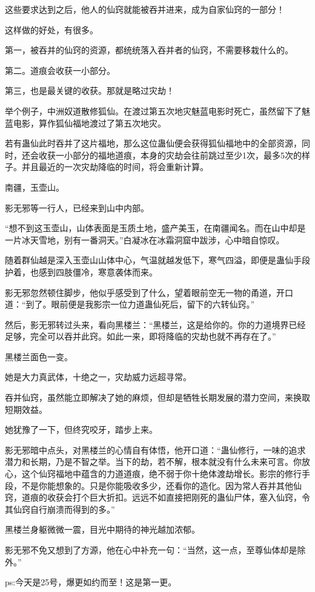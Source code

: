 \begin{this_body}
这些要求达到之后，他人的仙窍就能被吞并进来，成为自家仙窍的一部分！

这样做的好处，有很多。

第一，被吞并的仙窍的资源，都统统落入吞并者的仙窍，不需要移栽什么的。

第二。道痕会收获一小部分。

第三，也是最关键的收获。那就是略过灾劫！

举个例子，中洲奴道散修狐仙。在渡过第五次地灾魅蓝电影时死亡，虽然留下了魅蓝电影，算作狐仙福地渡过了第五次地灾。

若有蛊仙此时吞并了这片福地，那么这位蛊仙便会获得狐仙福地中的全部资源，同时，还会收获一小部分的福地道痕，本身的灾劫会往前跳过至少1次，最多5次的样子。并且最近的一次灾劫降临的时间，将会重新计算。

南疆，玉壶山。

影无邪等一行人，已经来到山中内部。

“想不到这玉壶山，山体表面是玉质土地，盛产美玉，在南疆闻名。而在山中却是一片冰天雪地，别有一番洞天。”白凝冰在冰霜洞窟中跋涉，心中暗自惊叹。

随着群仙越是深入玉壶山山体中心，气温就越发低下，寒气四溢，即便是蛊仙手段护着，也感到四肢僵冷，寒意袭体而来。

影无邪忽然顿住脚步，他似乎感受到了什么，望着眼前空无一物的甬道，开口道：“到了。眼前便是我影宗一位力道蛊仙死后，留下的六转仙窍。”

然后，影无邪转过头来，看向黑楼兰：“黑楼兰，这是给你的。你的力道境界已经足够，完全可以吞并此窍。如此一来，即将降临的灾劫也就不再存在了。”

黑楼兰面色一变。

她是大力真武体，十绝之一，灾劫威力远超寻常。

吞并仙窍，虽然能立即解决了她的麻烦，但却是牺牲长期发展的潜力空间，来换取短期效益。

她犹豫了一下，但终究咬牙，踏步上来。

影无邪暗中点头，对黑楼兰的心情自有体悟，他开口道：“蛊仙修行，一味的追求潜力和长期，乃是不智之举。当下的劫，若不解，根本就没有什么未来可言。你放心，这个仙窍福地中蕴含的力道道痕，绝不弱于你十绝体渡劫增长。影宗的修行手段，不是你能想象的。只是你能吸收多少，还看你的造化。因为常人吞并其他仙窍，道痕的收获会打个巨大折扣。远远不如直接把刚死的蛊仙尸体，塞入仙窍，令其仙窍自行崩溃而得到的多。”

黑楼兰身躯微微一震，目光中期待的神光越加浓郁。

影无邪不免又想到了方源，他在心中补充一句：“当然，这一点，至尊仙体却是除外。”

ps:今天是25号，爆更如约而至！这是第一更。

\end{this_body}

